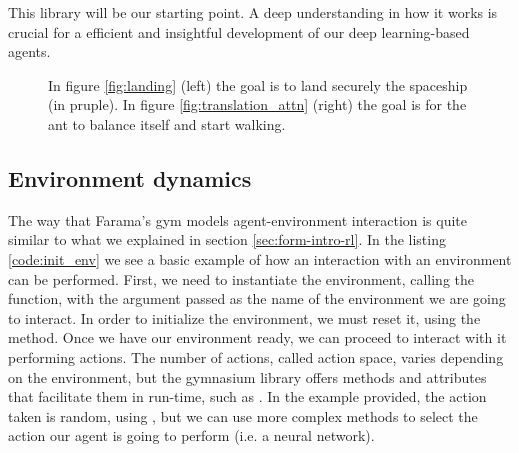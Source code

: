 This library will be our starting point. A deep understanding in how it works is crucial for a efficient and insightful development of our deep learning-based agents.

\begin{figure}[!h] 
	\centering
	\hfill%
	\caption{In figure \ref{fig:landing} (left) the goal is to land securely the spaceship (in pruple). In figure \ref{fig:translation_attn} (right) the goal is for the ant to balance itself and start walking.}
	\label{fig:faramas-gym}
\end{figure}

\subsection{Environment dynamics}
\label{sec:env_dyn}

The way that Farama's gym models agent-environment interaction is quite similar to what we explained in section \ref{sec:form-intro-rl}. In the listing \ref{code:init_env} we see a basic example of how an interaction with an environment can be performed. First, we need to instantiate the environment, calling the  function, with the argument passed as the name of the environment we are going to interact. In order to initialize the environment, we must reset it, using the  method. Once we have our environment ready, we can proceed to interact with it performing actions. The number of actions, called action space, varies depending on the environment, but the gymnasium library offers methods and attributes that facilitate them in run-time, such as . In the example provided, the action taken is random, using , but we can use more complex methods to select the action our agent is going to perform (i.e. a neural network). 

